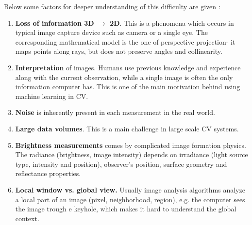 Below some factors for deeper understanding of this difficulty are given \cite{Sonka99}:

\begin{enumerate}
\item {\bf Loss of information 3D $\rightarrow$ 2D}. This is a phenomena which occurs in typical image capture device such as camera or a single eye. The corresponding mathematical model is the one of perspective projection- it maps points along rays, but does not preserve angles and collinearity.
\item {\bf Interpretation} of images. Humans use previous knowledge and experience along with the current observation, while a single image is often the only information computer has. This is one of the  main motivation behind using machine learning in CV.
\item {\bf Noise} is inherently present in each measurement in the real world. 
\item {\bf Large data volumes}. This is a main challenge in large scale CV systems.
\item {\bf Brightness measurements} comes by complicated image formation physics. The radiance (brightness, image intensity) depends on irradiance (light source type, intensity and position), observer's position, surface geometry and reflectance properties.
\item {\bf Local window vs. global view.} Usually image analysis algorithms analyze a local part of an image (pixel, neighborhood, region), e.g. the computer sees the image trough e keyhole, which makes it hard to understand the global context.
\end{enumerate}
 
